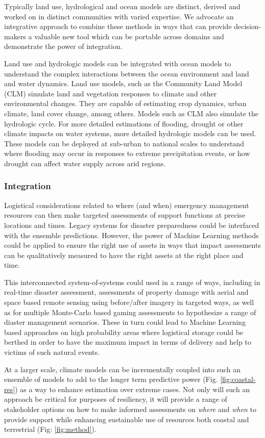 Typically land use, hydrological and ocean models are distinct,
derived and worked on in distinct communities with varied expertise.
We advocate an integrative approach to combine these methods in ways
that can provide decision-makers a valuable new tool which can be
portable across domains and demonstrate the power of integration.

Land use and hydrologic models can be integrated with ocean models to
understand the complex interactions between the ocean environment and
land and water dynamics. Land use models, such as the Community Land
Model (CLM) simulate land and vegetation responses to climate and
other environmental changes. They are capable of estimating crop
dynamics, urban climate, land cover change, among others. Models such
as CLM also simulate the hydrologic cycle. For more detailed
estimations of flooding, drought or other climate impacts on water
systems, more detailed hydrologic models can be used. These models can
be deployed at sub-urban to national scales to understand where
flooding may occur in responses to extreme precipitation events, or
how drought can affect water supply across arid regions.




\subsubsection*{Integration}

Logistical considerations related to where (and when) emergency
management resources can then make targeted assessments of support
functions at precise locations and times. Legacy systems for disaster
preparedness could be interfaced with the ensemble
predictions. However, the power of Machine Learning methods could be
applied to ensure the right use of assets in ways that impact
assessments can be qualitatively measured to have the right assets at
the right place and time. 

This interconnected system-of-systems could used in a range of ways,
including in real-time disaster assessment, assessments of property
damage with aerial and space based remote sensing using before/after
imagery in targeted ways, as well as for multiple Monte-Carlo based
gaming assessments to hypothesize a range of diaster management
scenarios. These in turn could lead to Machine Learning based approaches
on high probability areas where logistical storage could be berthed in
order to have the maximum impact in terms of delivery and help to
victims of such natural events.

At a larger scale, climate models can be incrementally coupled into
such an ensemble of models to add to the longer term predictive power
(Fig. \ref{fig:coastal-res}) as a way to enhance estimation over
extreme cases. Not only will such an approach be critical for purposes
of resiliency, it will provide a range of stakeholder options on how
to make informed assessments on \emph{where} and \emph{when} to
provide support while enhancing sustainable use of resources both
coastal and terrestrial (Fig: \ref{fig:method}).

